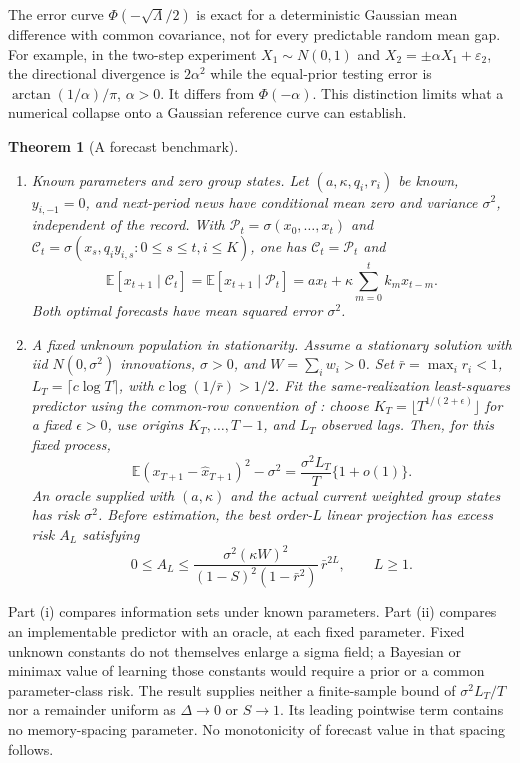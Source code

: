\documentclass[12pt]{article}
\newtheorem{theorem}{Theorem}[section]
\theoremstyle{definition}
\theoremstyle{remark}
\begin{document}
The error curve $\Phi(-\sqrt{\Lambda}/2)$ is exact for a deterministic Gaussian mean difference with common covariance, not for every predictable random mean gap. For example, in the two-step experiment $X_1\sim N(0,1)$ and $X_2=\pm\alpha X_1+\varepsilon_2$, the directional divergence is $2\alpha^2$ while the equal-prior testing error is $\arctan(1/\alpha)/\pi$, $\alpha>0$. It differs from $\Phi(-\alpha)$. This distinction limits what a numerical collapse onto a Gaussian reference curve can establish.

\begin{theorem}[A forecast benchmark]\label{n:irr}
\begin{enumerate}[label=(\roman*),itemsep=1pt]
\item \emph{Known parameters and zero group states.} Let $(a,\kappa,q_i,r_i)$ be known, $y_{i,-1}=0$, and next-period news have conditional mean zero and variance $\sigma^2$, independent of the record. With $\mathcal P_t=\sigma(x_0,\ldots,x_t)$ and $\mathcal C_t=\sigma(x_s,q_i y_{i,s}:0\le s\le t, i\le K)$, one has $\mathcal C_t=\mathcal P_t$ and
\[
\mathbb E[x_{t+1}\mid\mathcal C_t]=\mathbb E[x_{t+1}\mid\mathcal P_t]
=a x_t+\kappa\sum_{m=0}^t k_m x_{t-m}.
\]
Both optimal forecasts have mean squared error $\sigma^2$.
\item \emph{A fixed unknown population in stationarity.} Assume a stationary solution with iid $N(0,\sigma^2)$ innovations, $\sigma>0$, and $W=\sum_iw_i>0$. Set $\bar r=\max_i r_i<1$, $L_T=\lceil c\log T\rceil$, with $c\log(1/\bar r)>1/2$. Fit the same-realization least-squares predictor using the common-row convention of \citet[Proposition~2]{ingwei2005}: choose $K_T=\lfloor T^{1/(2+\epsilon)}\rfloor$ for a fixed $\epsilon>0$, use origins $K_T,\ldots,T-1$, and $L_T$ observed lags. Then, for this fixed process,
\[
\mathbb E(x_{T+1}-\hat x_{T+1})^2-\sigma^2
=\frac{\sigma^2 L_T}{T}\{1+o(1)\}.
\]
An oracle supplied with $(a,\kappa)$ and the actual current weighted group states has risk $\sigma^2$. Before estimation, the best order-$L$ linear projection has excess risk $A_L$ satisfying
\[
0\le A_L\le
\frac{\sigma^2(\kappa W)^2}{(1-S)^2(1-\bar r^2)}\,\bar r^{2L},\qquad L\ge1.
\]
\end{enumerate}
\end{theorem}

Part (i) compares information sets under known parameters. Part (ii) compares an implementable predictor with an oracle, at each fixed parameter. Fixed unknown constants do not themselves enlarge a sigma field; a Bayesian or minimax value of learning those constants would require a prior or a common parameter-class risk. The result supplies neither a finite-sample bound of $\sigma^2L_T/T$ nor a remainder uniform as $\Delta\to0$ or $S\to1$. Its leading pointwise term contains no memory-spacing parameter. No monotonicity of forecast value in that spacing follows.
\end{document}
